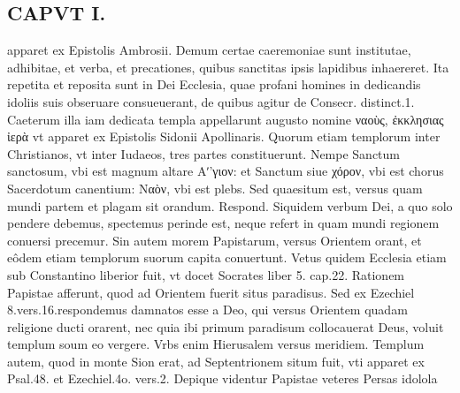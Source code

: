 \documentclass{article}
\begin{document}
\begin{pages}
\section*{CAPVT I. }
\marginpar{[ p.73 ]}\pstart apparet ex Epistolis Ambrosii. Demum certae caeremoniae sunt institutae, adhibitae, et verba, et precationes, quibus sanctitas ipsis lapidibus inhaereret. Ita repetita et reposita sunt in Dei Ecclesia, quae profani homines in dedicandis idoliis suis obseruare consueuerant, de quibus agitur de Consecr. distinct.1. Caeterum illa iam dedicata templa appellarunt augusto nomine ναοὺς, ἐκκλησιας ἰερὰ vt apparet ex Epistolis Sidonii Apollinaris. Quorum etiam templorum inter Christianos, vt inter Iudaeos, tres partes constituerunt. Nempe Sanctum sanctosum, vbi est magnum altare Aʹ'γιον: et Sanctum siue χόρον, vbi est chorus Sacerdotum canentium: Ναὸν, vbi est plebs.  \pend\pstart Sed quaesitum est, versus quam mundi partem et plagam sit orandum. Respond. Siquidem verbum Dei, a quo solo pendere debemus, spectemus perinde est, neque refert in quam mundi regionem conuersi precemur. Sin autem morem Papistarum, versus Orientem orant, et eôdem etiam templorum suorum capita conuertunt. Vetus quidem Ecclesia etiam sub Constantino liberior fuit, vt docet Socrates liber  5. cap.22. Rationem Papistae afferunt, quod ad Orientem fuerit situs paradisus. Sed ex Ezechiel 8.vers.16.respondemus damnatos esse a Deo, qui versus Orientem quadam religione ducti orarent, nec quia ibi primum paradisum collocauerat Deus, voluit templum soum eo vergere. Vrbs enim Hierusalem versus meridiem. Templum autem, quod in monte Sion erat, ad Septentrionem situm fuit, vti apparet ex Psal.48. et Ezechiel.4o. vers.2. Depique videntur Papistae veteres Persas idolola\pend

\end{pages}
\end{document}
